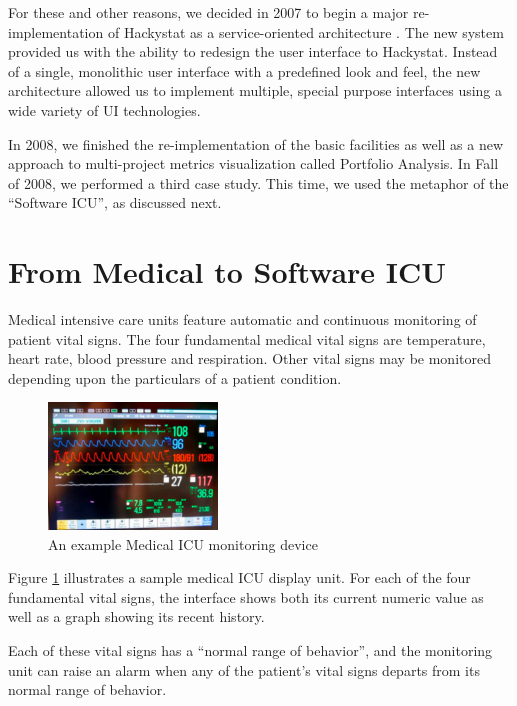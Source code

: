 \documentclass{acm_proc_article-sp}
\begin{document}
For these and other reasons, we decided in 2007 to begin a major
re-implementation of Hackystat as a service-oriented architecture
\cite{csdl2-09-07}. The new system provided us with the ability to redesign
the user interface to Hackystat.  Instead of a single, monolithic user
interface with a predefined look and feel, the new architecture allowed us
to implement multiple, special purpose interfaces using a wide variety of
UI technologies.  

In 2008, we finished the re-implementation of the basic facilities as well
as a new approach to multi-project metrics visualization called Portfolio
Analysis.  In Fall of 2008, we performed a third case study. This time, we
used the metaphor of the ``Software ICU'', as discussed next.

\section{From Medical to Software ICU}
\label{sec:icu}

Medical intensive care units feature automatic and continuous monitoring of
patient vital signs.  The four fundamental medical vital signs are
temperature, heart rate, blood pressure and respiration.  Other vital signs
may be monitored depending upon the particulars of a patient condition.

\begin{figure}[ht]
  \center
  \includegraphics[width=0.4\textwidth]{micu-screen.eps}
  \caption{An example Medical ICU monitoring device}
  \label{fig:micu}
\end{figure} 

Figure \ref{fig:micu} illustrates a sample medical ICU display unit. For
each of the four fundamental vital signs, the interface shows both its
current numeric value as well as a graph showing its recent history.  

Each of these vital signs has a ``normal range of behavior'', and the
monitoring unit can raise an alarm when any of the patient's vital signs departs
from its normal range of behavior.
\end{document}
